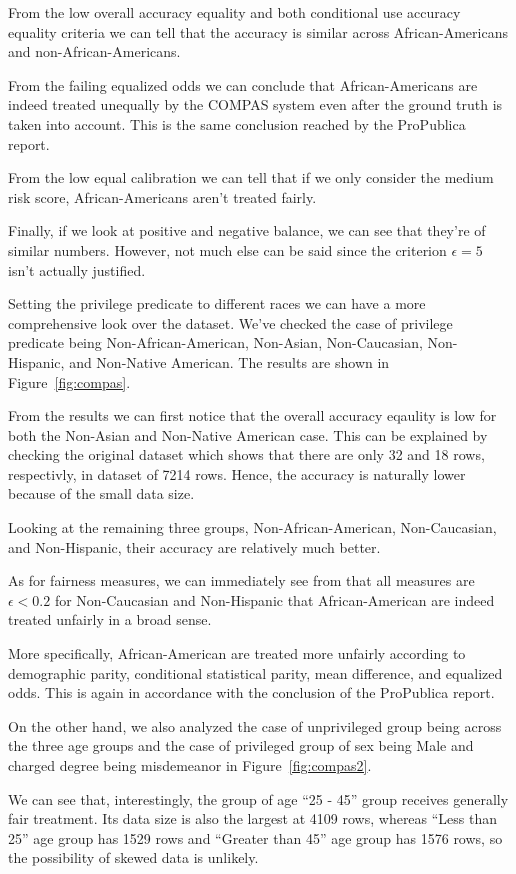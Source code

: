 \documentclass[conference]{IEEEtran}
\begin{document}
From the low overall accuracy equality and both conditional use accuracy equality criteria we can tell that the accuracy is similar across African-Americans and non-African-Americans.

From the failing equalized odds we can conclude that African-Americans are indeed treated unequally by the COMPAS system even after the ground truth is taken into account. This is the same conclusion reached by the ProPublica report.

From the low equal calibration we can tell that if we only consider the medium risk score, African-Americans aren't treated fairly.

Finally, if we look at positive and negative balance, we can see that they're of similar numbers. However, not much else can be said since the criterion $\epsilon = 5$ isn't actually justified.

Setting the privilege predicate to different races we can have a more comprehensive look over the dataset. We've checked the case of privilege predicate being Non-African-American, Non-Asian, Non-Caucasian, Non-Hispanic, and Non-Native American. The results are shown in Figure~\ref{fig:compas}.

From the results we can first notice that the overall accuracy eqaulity is low for both the Non-Asian and Non-Native American case. This can be explained by checking the original dataset which shows that there are only 32 and 18 rows, respectivly, in dataset of 7214 rows. Hence, the accuracy is naturally lower because of the small data size.

Looking at the remaining three groups, Non-African-American, Non-Caucasian, and Non-Hispanic, their accuracy are relatively much better.

As for fairness measures, we can immediately see from that all measures are $\epsilon < 0.2$ for Non-Caucasian and Non-Hispanic that African-American are indeed treated unfairly in a broad sense.

More specifically, African-American are treated more unfairly according to demographic parity, conditional statistical parity, mean difference, and equalized odds. This is again in accordance with the conclusion of the ProPublica report.

On the other hand, we also analyzed the case of unprivileged group being across the three age groups and the case of privileged group of sex being Male and charged degree being misdemeanor in Figure~\ref{fig:compas2}.

We can see that, interestingly, the group of age ``25 - 45'' group receives generally fair treatment. Its data size is also the largest at 4109 rows, whereas ``Less than 25'' age group has 1529 rows and ``Greater than 45'' age group has 1576 rows, so the possibility of skewed data is unlikely.
\end{document}
